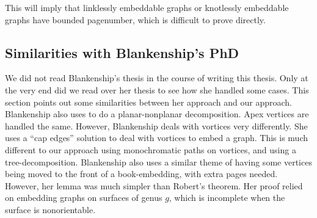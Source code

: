 This will imply that linklessly embeddable graphs or knotlessly embeddable graphs have bounded pagenumber, which is difficult to prove directly. 

\subsection{Similarities with Blankenship's PhD}
We did not read Blankenship's thesis in the course of writing this thesis. Only at the very end did we read over her thesis to see how she handled some cases. 
This section points out some similarities between her approach and our approach.
Blankenship also uses \textcite{heathPagenumberGenusGraphs1992} to do a planar-nonplanar decomposition. Apex vertices are handled the same. However, Blankenship deals with vortices very differently. She uses a ``cap edges'' solution to deal with vortices to embed a graph. This is much different to our approach using monochromatic paths on vortices, and using a tree-decomposition. 
Blankenship also uses a similar theme of having some vertices being moved to the front of a book-embedding, with extra pages needed. However, her lemma was much simpler than Robert's theorem. Her proof relied on \textcite{heathPagenumberGenusGraphs1992} embedding graphs on surfaces of genus $g$, which is incomplete when the surface is nonorientable. 